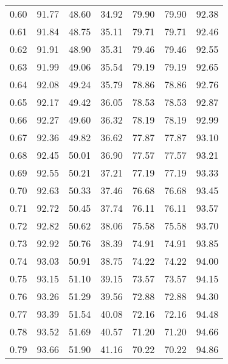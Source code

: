 \begin{tabular}{|c|c|c|c|c|c|c|}
      0.60 &     91.77 &     48.60 &      34.92 &   79.90 &      79.90 &         92.38 \\
      0.61 &     91.84 &     48.75 &      35.11 &   79.71 &      79.71 &         92.46 \\
      0.62 &     91.91 &     48.90 &      35.31 &   79.46 &      79.46 &         92.55 \\
      0.63 &     91.99 &     49.06 &      35.54 &   79.19 &      79.19 &         92.65 \\
      0.64 &     92.08 &     49.24 &      35.79 &   78.86 &      78.86 &         92.76 \\
      0.65 &     92.17 &     49.42 &      36.05 &   78.53 &      78.53 &         92.87 \\
      0.66 &     92.27 &     49.60 &      36.32 &   78.19 &      78.19 &         92.99 \\
      0.67 &     92.36 &     49.82 &      36.62 &   77.87 &      77.87 &         93.10 \\
      0.68 &     92.45 &     50.01 &      36.90 &   77.57 &      77.57 &         93.21 \\
      0.69 &     92.55 &     50.21 &      37.21 &   77.19 &      77.19 &         93.33 \\
      0.70 &     92.63 &     50.33 &      37.46 &   76.68 &      76.68 &         93.45 \\
      0.71 &     92.72 &     50.45 &      37.74 &   76.11 &      76.11 &         93.57 \\
      0.72 &     92.82 &     50.62 &      38.06 &   75.58 &      75.58 &         93.70 \\
      0.73 &     92.92 &     50.76 &      38.39 &   74.91 &      74.91 &         93.85 \\
      0.74 &     93.03 &     50.91 &      38.75 &   74.22 &      74.22 &         94.00 \\
      0.75 &     93.15 &     51.10 &      39.15 &   73.57 &      73.57 &         94.15 \\
      0.76 &     93.26 &     51.29 &      39.56 &   72.88 &      72.88 &         94.30 \\
      0.77 &     93.39 &     51.54 &      40.08 &   72.16 &      72.16 &         94.48 \\
      0.78 &     93.52 &     51.69 &      40.57 &   71.20 &      71.20 &         94.66 \\
      0.79 &     93.66 &     51.90 &      41.16 &   70.22 &      70.22 &         94.86 \\

\end{tabular}
